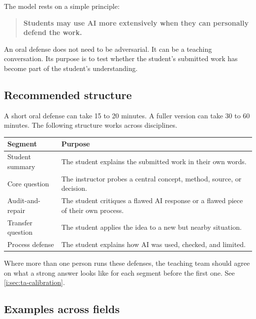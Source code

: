 \documentclass{SIAMbook2023}
\begin{document}
The model rests on a simple principle:

\begin{quote}
\textbf{Students may use AI more extensively when they can personally defend the work.}
\end{quote}

An oral defense does not need to be adversarial. It can be a teaching conversation. Its purpose is to test whether the student's submitted work has become part of the student's understanding.

\subsection{Recommended structure}
\label{i:subsec:oral-structure}%

A short oral defense can take 15 to 20 minutes. A fuller version can take 30 to 60 minutes. The following structure works across disciplines.

\begin{center}
\begin{tabular}{p{}p{}}
\toprule
\textbf{Segment} & \textbf{Purpose} \\
\midrule
Student summary & The student explains the submitted work in their own words. \\
Core question & The instructor probes a central concept, method, source, or decision. \\
Audit-and-repair & The student critiques a flawed AI response or a flawed piece of their own process. \\
Transfer question & The student applies the idea to a new but nearby situation. \\
Process defense & The student explains how AI was used, checked, and limited. \\
\bottomrule
\end{tabular}
\end{center}

Where more than one person runs these defenses, the teaching team should agree on what a strong answer looks like for each segment before the first one. See \cref{i:sec:ta-calibration}.

\subsection{Examples across fields}
\label{i:subsec:oral-examples}
\end{document}

